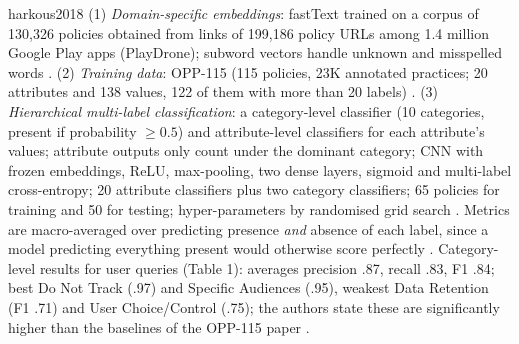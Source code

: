 \begin{papercard}{harkous2018}
 (1) \emph{Domain-specific embeddings}: fastText trained on a corpus of 130,326 policies obtained from links of 199,186 policy URLs among 1.4 million Google Play apps (PlayDrone); subword vectors handle unknown and misspelled words . (2) \emph{Training data}: OPP-115 (115 policies, 23K annotated practices; 20 attributes and 138 values, 122 of them with more than 20 labels) . (3) \emph{Hierarchical multi-label classification}: a category-level classifier (10 categories, present if probability $\ge0.5$) and attribute-level classifiers for each attribute's values; attribute outputs only count under the dominant category; CNN with frozen embeddings, ReLU, max-pooling, two dense layers, sigmoid and multi-label cross-entropy; 20 attribute classifiers plus two category classifiers; 65 policies for training and 50 for testing; hyper-parameters by randomised grid search . Metrics are macro-averaged over predicting presence \emph{and} absence of each label, since a model predicting everything present would otherwise score perfectly . Category-level results for user queries (Table 1): averages precision .87, recall .83, F1 .84; best Do Not Track (.97) and Specific Audiences (.95), weakest Data Retention (F1 .71) and User Choice/Control (.75); the authors state these are significantly higher than the baselines of the OPP-115 paper .


\end{papercard}
